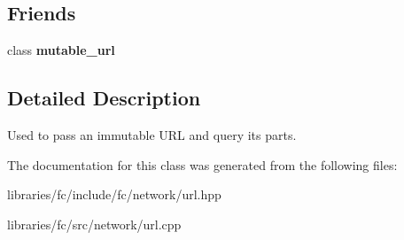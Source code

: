 \subsection*{Friends}
\begin{DoxyCompactItemize}
\item 
\mbox{\label{classfc_1_1url_a8fcf17901a1b195dcdf8f64c90b86e6e}} 
class {\bfseries mutable\+\_\+url}
\end{DoxyCompactItemize}


\subsection{Detailed Description}
Used to pass an immutable U\+RL and query its parts. 

The documentation for this class was generated from the following files\+:\begin{DoxyCompactItemize}
\item 
libraries/fc/include/fc/network/url.\+hpp\item 
libraries/fc/src/network/url.\+cpp\end{DoxyCompactItemize}
